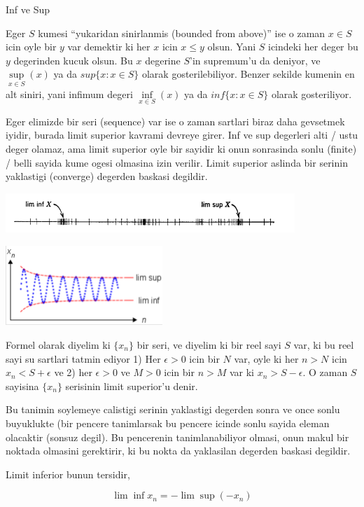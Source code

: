 \documentclass[12pt,fleqn]{article}
\begin{document}
Inf ve Sup

Eger $S$ kumesi ``yukaridan sinirlanmis (bounded from above)'' ise o zaman
$x \in S$ icin oyle bir $y$ var demektir ki her $x$ icin $x \le y$
olsun. Yani $S$ icindeki her deger bu $y$ degerinden kucuk olsun. Bu $x$
degerine $S$'in supremum'u da deniyor, ve $\sup\limits_{x \in S}(x)$ ya da
$sup\{x:x \in S\}$ olarak gosterilebiliyor. Benzer sekilde kumenin en alt
siniri, yani infimum degeri $\inf\limits_{x \in S}(x)$ ya da $inf\{x:x \in
S\}$ olarak gosteriliyor. 

Eger elimizde bir seri (sequence) var ise o zaman sartlari biraz daha
gevsetmek iyidir, burada limit superior kavrami devreye girer. Inf ve sup
degerleri alti / ustu deger olamaz, ama limit superior oyle bir sayidir ki
onun sonrasinda sonlu (finite) / belli sayida kume ogesi olmasina izin
verilir. Limit superior aslinda bir serinin yaklastigi (converge) degerden
baskasi degildir. 

\includegraphics[height=1.5cm]{2_01.png}

\includegraphics[height=3cm]{2_02.png}

Formel olarak diyelim ki $\{x_n\}$ bir seri, ve diyelim ki bir reel
sayi $S$ var, ki bu reel sayi su sartlari tatmin ediyor 
1) Her $\epsilon > 0$ icin bir $N$ var, oyle ki her $n>N$ icin $x_n
< S + \epsilon$ 
ve 2) her $\epsilon > 0$ ve $M>0$ icin bir  $n>M$ var ki $x_n
> S - \epsilon$. O 
zaman $S$ sayisina  $\{x_n\}$ serisinin limit superior'u denir. 

Bu tanimin soylemeye calistigi serinin yaklastigi degerden sonra ve once
sonlu buyuklukte (bir pencere tanimlarsak bu pencere icinde sonlu sayida
eleman olacaktir (sonsuz degil). Bu pencerenin tanimlanabiliyor olmasi,
onun makul bir noktada olmasini gerektirir, ki bu nokta da yaklasilan
degerden baskasi degildir. 

Limit inferior bunun tersidir, 

\[ \lim \inf x_n  = -\lim \sup(-x_n)\]
\end{document}
